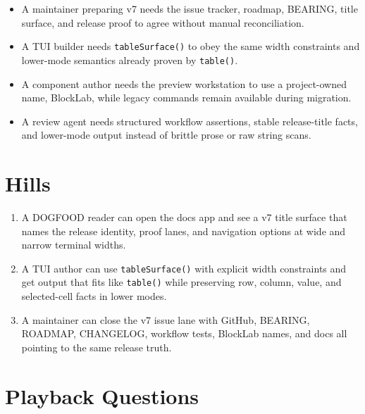 \begin{itemize}
\tightlist
\item
  A maintainer preparing v7 needs the issue tracker, roadmap, BEARING, title surface, and release proof to agree without manual reconciliation.
\item
  A TUI builder needs \texttt{t\allowbreak{}a\allowbreak{}b\allowbreak{}l\allowbreak{}e\allowbreak{}S\allowbreak{}u\allowbreak{}r\allowbreak{}f\allowbreak{}a\allowbreak{}c\allowbreak{}e\allowbreak{}(\allowbreak{})} to obey the same width constraints and lower-mode semantics already proven by \texttt{t\allowbreak{}a\allowbreak{}b\allowbreak{}l\allowbreak{}e\allowbreak{}(\allowbreak{})}.
\item
  A component author needs the preview workstation to use a project-owned name, BlockLab, while legacy commands remain available during migration.
\item
  A review agent needs structured workflow assertions, stable release-title facts, and lower-mode output instead of brittle prose or raw string scans.
\end{itemize}

\section{Hills}\label{record-101-hills}

\begin{enumerate}
\def\labelenumi{\arabic{enumi}.}
\tightlist
\item
  A DOGFOOD reader can open the docs app and see a v7 title surface that names the release identity, proof lanes, and navigation options at wide and narrow terminal widths.
\item
  A TUI author can use \texttt{t\allowbreak{}a\allowbreak{}b\allowbreak{}l\allowbreak{}e\allowbreak{}S\allowbreak{}u\allowbreak{}r\allowbreak{}f\allowbreak{}a\allowbreak{}c\allowbreak{}e\allowbreak{}(\allowbreak{})} with explicit width constraints and get output that fits like \texttt{t\allowbreak{}a\allowbreak{}b\allowbreak{}l\allowbreak{}e\allowbreak{}(\allowbreak{})} while preserving row, column, value, and selected-cell facts in lower modes.
\item
  A maintainer can close the v7 issue lane with GitHub, BEARING, ROADMAP, CHANGELOG, workflow tests, BlockLab names, and docs all pointing to the same release truth.
\end{enumerate}

\section{Playback Questions}\label{record-101-playback-questions}

